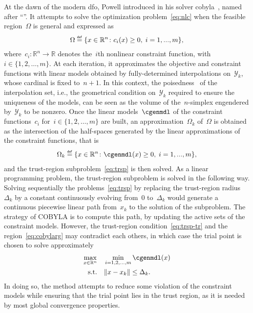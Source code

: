\documentclass[11pt,draft]{article}
\numberwithin{equation}{section}
\def\defeq{\ensuremath{\mathrel{\stackrel{\text{\tiny\textsf{def}}}{=}}}}
\def\R{\ensuremath{\mathbb{R}}}
\newcommand\norm[2][]{#1\|#2#1\|}
\newcommand\set[2][]{#1\{#2#1\}}
\def\srchsp{\ensuremath{\Omega}}
\newcommand\cgen[1][i]{c_{#1}}
\newcommand\srchspmdl[1][k]{\Omega_{#1}}
\newcommand\iter[1][k]{x_{#1}}
\newcommand\trg[1][k]{\Delta_{#1}}
\newcommand\itpls[1][k]{\mathcal{Y}_{#1}}
\begin{document}
At the dawn of the modern \gls{dfo}, Powell introduced in  his solver \gls{cobyla}~\cite{Powell_1994}, named after \enquote{}.
It attempts to solve the optimization problem~\eqref{eq:nlc} when the feasible region~$\srchsp$ is general and expressed as
\[
    \srchsp \defeq \set{x \in \R^n \colon \cgen(x) \ge 0,\; i=1,...,m},
\]
where~$\cgen \colon \R^n \to \R$ denotes the~$i$th nonlinear constraint function, with~$i \in \set{1, 2, \dots, m}$.
At each iteration, it approximates the objective and constraint functions with linear models obtained by fully-determined interpolations on~$\itpls$, whose cardinal is fixed to~$n + 1$.
In this context, the poisedness~\cite[\S 1]{Sauer_Xu_1995} of the interpolation set, i.e., the geometrical condition on~$\itpls$ required to ensure the uniqueness of the models, can be seen as the volume of the~$n$-simplex engendered by~$\itpls$ to be nonzero.
Once the linear models~$\cgenmdl$ of the constraint functions~$\cgen$ for~$i \in \set{1, 2, \dots, m}$ are built, an approximation~$\srchspmdl$ of~$\srchsp$ is obtained as the intersection of the half-spaces generated by the linear approximations of the constraint functions, that is
\begin{equation}
    \label{eq:cobylarg}
    \srchspmdl \defeq \set{x \in \R^n \colon \cgenmdl(x) \ge 0,\; i=1,...,m},
\end{equation}
and the trust-region subproblem~\eqref{eq:trsp} is then solved.
As a linear programming problem, the trust-region subproblem is solved in the following way.
Solving sequentially the problems~\eqref{eq:trsp} by replacing the trust-region radius~$\trg$ by a constant continuously evolving from~$0$ to~$\trg$ would generate a continuous piecewise linear path from~$\iter$ to the solution of the subproblem.
The strategy of COBYLA is to compute this path, by updating the active sets of the constraint models.
However, the trust-region condition~\eqref{eq:trsp-tr} and the region~\eqref{eq:cobylarg} may contradict each others, in which case the trial point is chosen to solve approximately
\begin{align*}
    \max_{x \in \R^n}   & \quad \min_{i = 1, 2, \dots, m} \cgenmdl(x)\\
    \text{s.t.}         & \quad \norm{x - \iter} \le \trg.
\end{align*}
In doing so, the method attempts to reduce some violation of the constraint models while ensuring that the trial point lies in the trust region, as it is needed by most global convergence properties.
\end{document}
